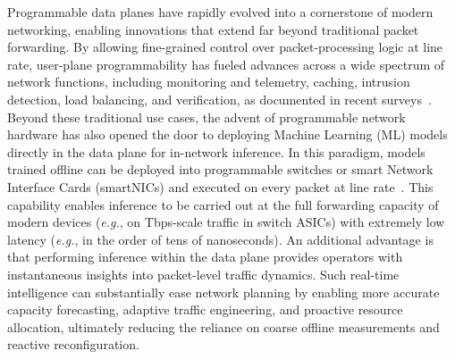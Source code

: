 \documentclass[journal]{IEEEtran}
\theoremstyle{plain} %
\newcommand{\eg}{\textit{e.g.},\xspace}
\newcommand{\td}[1]{\textcolor{red}{[TODO: #1]}}
\begin{document}
\label{sec:intro}
Programmable data planes have rapidly evolved into a cornerstone of modern networking, enabling innovations that extend far beyond traditional packet forwarding. By allowing fine-grained control over packet-processing logic at line rate, user-plane programmability has fueled advances across a wide spectrum of network functions, including monitoring and telemetry, caching, intrusion detection, load balancing, and verification, as documented in recent surveys~\cite{Hauser2021ASO,Kfoury2021AnES,kaur-p4-review}.
%
Beyond these traditional use cases, the advent of programmable network hardware has also opened the door to deploying Machine Learning (ML) models directly in the data plane for in-network inference. In this paradigm, models trained offline can be deployed into programmable switches or smart Network Interface Cards (smartNICs) and executed on every packet at line rate~\cite{in-network-ml-survey}. This capability enables inference to be carried out at the full forwarding capacity of modern devices (\eg on Tbps-scale traffic in switch ASICs) with extremely low latency (\eg in the order of tens of nanoseconds).
An additional advantage is that performing inference within the data plane provides operators with instantaneous insights into packet-level traffic dynamics. Such real-time intelligence can substantially ease network planning by enabling more accurate capacity forecasting, adaptive traffic engineering, and proactive resource allocation, ultimately reducing the reliance on coarse offline measurements and reactive reconfiguration.
\end{document}
